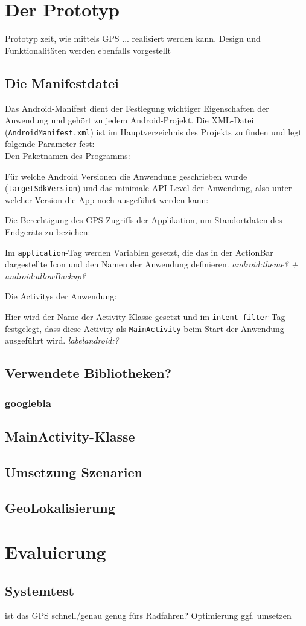 \chapter{\label{chap:implementierung}Der Prototyp}
Prototyp zeit, wie mittels GPS ... realisiert werden kann.
Design und Funktionalitäten werden ebenfalls vorgestellt
\section{Die Manifestdatei}
Das Android-Manifest dient der Festlegung wichtiger Eigenschaften der Anwendung und gehört zu jedem Android-Projekt. Die \gls{XML}-Datei (\texttt{AndroidManifest.xml}) ist im Hauptverzeichnis des Projekts zu finden und legt folgende Parameter fest: \\
Den Paketnamen des Programms:

Für welche Android Versionen die Anwendung geschrieben wurde (\texttt{targetSdkVersion}) und das minimale \gls{API}-Level der Anwendung, also unter welcher Version die App noch ausgeführt werden kann:

Die Berechtigung des \gls{GPS}-Zugriffs der Applikation, um Standortdaten des Endgeräts zu beziehen:

Im \texttt{application}-Tag werden Variablen gesetzt, die das in der ActionBar dargestellte Icon und den Namen der Anwendung definieren. \textit{android:theme? + android:allowBackup?}

Die \glspl{Activity} der Anwendung:

Hier wird der Name der \gls{Activity}-Klasse gesetzt und im \texttt{intent-filter}-Tag festgelegt, dass diese \gls{Activity} als \texttt{MainActivity} beim Start der Anwendung ausgeführt wird. \textit{labelandroid:?}
\section{Verwendete Bibliotheken?}
\subsection{googlebla}
\section{MainActivity-Klasse}
\section{Umsetzung Szenarien}
\section{GeoLokalisierung}
%
%
\chapter{Evaluierung}
\section{Systemtest}
ist das GPS schnell/genau genug fürs Radfahren?
Optimierung ggf. umsetzen
